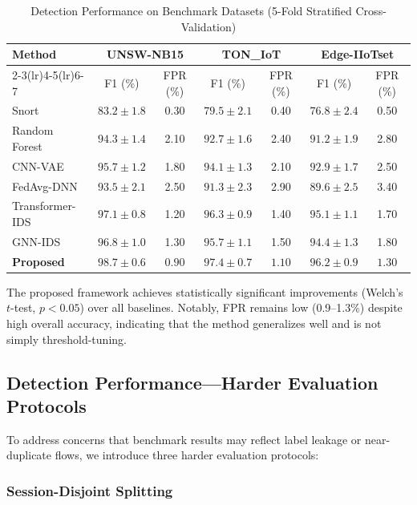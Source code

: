 \documentclass[preprint,12pt]{elsarticle}
\begin{document}
\begin{table}[!t]
\caption{Detection Performance on Benchmark Datasets (5-Fold Stratified Cross-Validation)}
\label{tab:detection_standard}
\centering
\small
\renewcommand{\arraystretch}{1.15}
\begin{tabular}{@{}lcccccc@{}}
\toprule
\textbf{Method} & \multicolumn{2}{c}{\textbf{UNSW-NB15}} & \multicolumn{2}{c}{\textbf{TON\_IoT}} & \multicolumn{2}{c}{\textbf{Edge-IIoTset}} \\
\cmidrule(lr){2-3}\cmidrule(lr){4-5}\cmidrule(lr){6-7}
& F1 (\%) & FPR (\%) & F1 (\%) & FPR (\%) & F1 (\%) & FPR (\%) \\
\midrule
Snort & $83.2 \pm 1.8$ & 0.30 & $79.5 \pm 2.1$ & 0.40 & $76.8 \pm 2.4$ & 0.50 \\
Random Forest & $94.3 \pm 1.4$ & 2.10 & $92.7 \pm 1.6$ & 2.40 & $91.2 \pm 1.9$ & 2.80 \\
CNN-VAE & $95.7 \pm 1.2$ & 1.80 & $94.1 \pm 1.3$ & 2.10 & $92.9 \pm 1.7$ & 2.50 \\
FedAvg-DNN & $93.5 \pm 2.1$ & 2.50 & $91.3 \pm 2.3$ & 2.90 & $89.6 \pm 2.5$ & 3.40 \\
Transformer-IDS & $97.1 \pm 0.8$ & 1.20 & $96.3 \pm 0.9$ & 1.40 & $95.1 \pm 1.1$ & 1.70 \\
GNN-IDS & $96.8 \pm 1.0$ & 1.30 & $95.7 \pm 1.1$ & 1.50 & $94.4 \pm 1.3$ & 1.80 \\
\midrule
\textbf{Proposed} & $\mathbf{98.7} \pm 0.6$ & $\mathbf{0.90}$ & $\mathbf{97.4} \pm 0.7$ & $\mathbf{1.10}$ & $\mathbf{96.2} \pm 0.9$ & $\mathbf{1.30}$ \\
\bottomrule
\end{tabular}
\end{table}

The proposed framework achieves statistically significant improvements (Welch's $t$-test, $p < 0.05$) over all baselines. Notably, FPR remains low (0.9--1.3\%) despite high overall accuracy, indicating that the method generalizes well and is not simply threshold-tuning.

\subsection{Detection Performance---Harder Evaluation Protocols}

To address concerns that benchmark results may reflect label leakage or near-duplicate flows, we introduce three harder evaluation protocols:

\subsubsection{Session-Disjoint Splitting}
\end{document}
